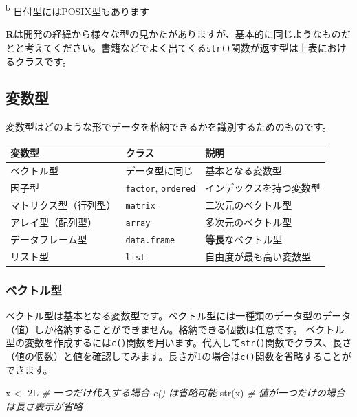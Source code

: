 \documentclass[
  12pt,
]{book}
\newenvironment{Shaded}{\begin{snugshade}}{\end{snugshade}}
\newcommand{\CommentTok}[1]{\textcolor[rgb]{0.56,0.35,0.01}{\textit{#1}}}
\newcommand{\FunctionTok}[1]{\textcolor[rgb]{0.00,0.00,0.00}{#1}}
\newcommand{\NormalTok}[1]{#1}
\newcommand{\OtherTok}[1]{\textcolor[rgb]{0.56,0.35,0.01}{#1}}
\begin{document}
\textsuperscript{b} 日付型にはPOSIX型もあります

\textbf{R}は開発の経緯から様々な型の見かたがありますが、基本的に同じようなものだとと考えてください。書籍などでよく出てくる\texttt{str()}関数が返す型は上表におけるクラスです。

\hypertarget{ux5909ux6570ux578b}{%
\subsection{変数型}\label{ux5909ux6570ux578b}}

変数型はどのような形でデータを格納できるかを識別するためのものです。

\begin{longtable}[]{@{}lll@{}}
\toprule
変数型 & クラス & 説明 \\
\midrule
\endhead
ベクトル型 & データ型に同じ & 基本となる変数型 \\
因子型 & \texttt{factor}, \texttt{ordered} & インデックスを持つ変数型 \\
マトリクス型（行列型） & \texttt{matrix} & 二次元のベクトル型 \\
アレイ型（配列型） & \texttt{array} & 多次元のベクトル型 \\
データフレーム型 & \texttt{data.frame} & \textbf{等長}なベクトル型 \\
リスト型 & \texttt{list} & 自由度が最も高い変数型 \\
\bottomrule
\end{longtable}

\hypertarget{ux30d9ux30afux30c8ux30ebux578b}{%
\subsubsection{ベクトル型}\label{ux30d9ux30afux30c8ux30ebux578b}}

ベクトル型は基本となる変数型です。ベクトル型には一種類のデータ型のデータ（値）しか格納することができません。格納できる個数は任意です。 ベクトル型の変数を作成するには\texttt{c()}関数を用います。代入して\texttt{str()}関数でクラス、長さ（値の個数）と値を確認してみます。長さが1の場合は\texttt{c()}関数を省略することができます。

\begin{Shaded}
\begin{Highlighting}[numbers=left,,]
\NormalTok{x }\OtherTok{\textless{}{-}}\NormalTok{ 2L                 }\CommentTok{\# 一つだけ代入する場合 \textasciigrave{}c()\textasciigrave{} は省略可能}
\FunctionTok{str}\NormalTok{(x)                  }\CommentTok{\# 値が一つだけの場合は長さ表示が省略}
\end{Highlighting}
\end{Shaded}
\end{document}
